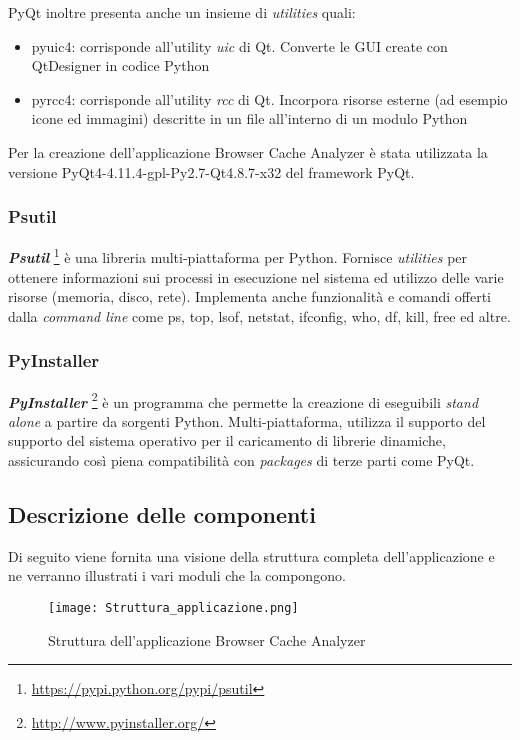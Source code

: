PyQt inoltre presenta anche un insieme di \textit{utilities} quali:

\begin{itemize}
	\item{pyuic4: corrisponde all'utility \textit{uic} di Qt. Converte le GUI create con QtDesigner in codice Python}
	\item{pyrcc4: corrisponde all'utility \textit{rcc} di Qt. Incorpora risorse esterne (ad esempio icone ed immagini) descritte in un file all'interno di un modulo Python }
\end{itemize} 

Per la creazione dell'applicazione Browser Cache Analyzer è stata utilizzata la versione PyQt4-4.11.4-gpl-Py2.7-Qt4.8.7-x32 del framework PyQt.
\clearpage

\subsubsection{Psutil}
\textbf{\textit{Psutil}} \footnote{\url{https://pypi.python.org/pypi/psutil}} è una libreria multi-piattaforma per Python. Fornisce \textit{utilities} per ottenere informazioni sui processi in esecuzione nel sistema ed utilizzo delle varie risorse (memoria, disco, rete). Implementa anche funzionalità e comandi offerti dalla \textit{command line} come ps, top, lsof, netstat, ifconfig, who, df, kill, free ed altre.

\subsubsection{PyInstaller}
\textbf{\textit{PyInstaller}} \footnote{\url{http://www.pyinstaller.org/}} è un programma che permette la creazione di eseguibili \textit{stand alone} a partire da sorgenti Python. Multi-piattaforma, utilizza il supporto del supporto del sistema operativo per il caricamento di librerie dinamiche, assicurando così piena compatibilità con \textit{packages} di terze parti come PyQt.
\clearpage

\subsection{Descrizione delle componenti}
Di seguito viene fornita una visione della struttura completa dell'applicazione e ne verranno illustrati i vari moduli che la compongono.

\begin{figure}[htpb]
	\begin{center}
		\texttt{[image: Struttura\_applicazione.png]}
	\end{center}
	\caption[Struttura dell'applicazione Browser Cache Analyzer]{Struttura dell'applicazione Browser Cache Analyzer}
\end{figure}

